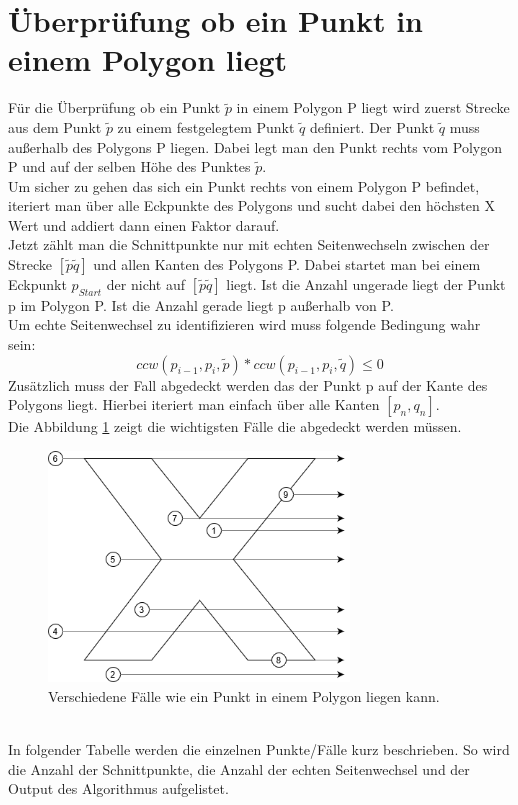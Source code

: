 \documentclass[conference]{IEEEtran}
\begin{document}
	\section{Überprüfung ob ein Punkt in einem Polygon liegt}
	Für die Überprüfung ob ein Punkt $\tilde{p}$ in einem Polygon P liegt wird zuerst Strecke aus dem Punkt $\tilde{p}$ zu einem festgelegtem Punkt $\tilde{q}$ definiert. Der Punkt $\tilde{q}$ muss außerhalb des Polygons P liegen. Dabei legt man den Punkt rechts vom Polygon P und auf der selben Höhe des Punktes $\tilde{p}$.\\
	Um sicher zu gehen das sich ein Punkt rechts von einem Polygon P befindet, iteriert man über alle Eckpunkte des Polygons und sucht dabei den höchsten X Wert und addiert dann einen Faktor darauf.\\
	Jetzt zählt man die Schnittpunkte nur mit echten Seitenwechseln zwischen der Strecke $[\tilde{p}\tilde{q}]$ und allen Kanten des Polygons P. Dabei startet man bei einem Eckpunkt $p_{Start}$ der nicht auf $[\tilde{p}\tilde{q}]$ liegt. Ist die Anzahl ungerade liegt der Punkt p im Polygon P. Ist die Anzahl gerade liegt p außerhalb von P.\\
	Um echte Seitenwechsel zu identifizieren wird muss folgende Bedingung wahr sein:
	\[ ccw(p_{i-1} , p_i, \tilde{p}) * ccw(p_{i-1} , p_i, \tilde{q}) \leq 0 \]
	Zusätzlich muss der Fall abgedeckt werden das der Punkt p auf der Kante des Polygons liegt. Hierbei iteriert man einfach über alle Kanten $[p_n,q_n]$.\\
	Die Abbildung \ref{PointInPoly} zeigt die wichtigsten Fälle die abgedeckt werden müssen.
	\begin{figure}[h]
		\begin{center}
			\includegraphics[width=8cm]{PointInPolygon.png}
			\caption{Verschiedene Fälle wie ein Punkt in einem Polygon liegen kann.}
			\label{PointInPoly}
		\end{center}
	\end{figure}\\
	In folgender Tabelle werden die einzelnen Punkte/Fälle kurz beschrieben. So wird die Anzahl der Schnittpunkte, die Anzahl der echten Seitenwechsel und der Output des Algorithmus aufgelistet.\\
	
\end{document}
